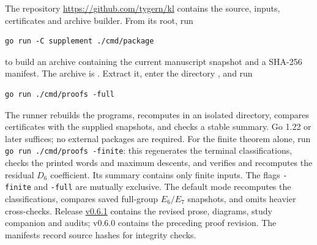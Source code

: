 \documentclass[10pt]{article}
\theoremstyle{remark}
\begin{document}
The repository \url{https://github.com/tygern/kl} contains the source,
inputs, certificates and archive builder. From its root, run
\begin{verbatim}
go run -C supplement ./cmd/package
\end{verbatim}
to build an archive containing the current manuscript snapshot and a
SHA-256 manifest. The archive is
.
Extract it, enter the directory , and run
\begin{verbatim}
go run ./cmd/proofs -full
\end{verbatim}
The runner rebuilds the programs, recomputes in an isolated directory,
compares certificates with the supplied snapshots, and checks a stable
summary. Go 1.22 or later suffices; no external packages are required.
For the finite theorem alone, run \texttt{go run ./cmd/proofs -finite}:
this regenerates the terminal classifications, checks the printed words
and maximum descents, and verifies and recomputes the residual $D_6$
coefficient. Its summary contains only finite inputs. The flags
\texttt{-finite} and \texttt{-full} are mutually exclusive.
The default mode recomputes the classifications, compares saved
full-group $E_6/E_7$ snapshots, and omits heavier cross-checks.
Release \href{https://github.com/tygern/kl/releases/tag/v0.6.1}{v0.6.1}
contains the revised prose, diagrams, study companion and audits;
v0.6.0 contains the preceding proof revision. The manifests record source hashes
for integrity checks.
\end{document}
